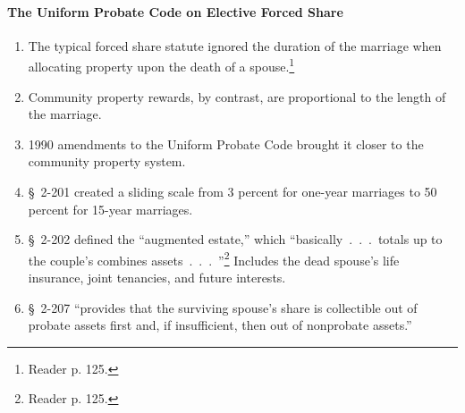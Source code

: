 
\paragraph{The Uniform Probate Code on Elective Forced Share}

\begin{enumerate}
    \item The typical forced share statute ignored the duration of the 
    marriage when allocating property upon the death of a 
    spouse.\footnote{Reader p. 125.}
    \item Community property rewards, by contrast, are proportional to the 
    length of the marriage.
    \item 1990 amendments to the Uniform Probate Code brought it closer to the 
    community property system.
    \item \S\ 2-201 created a sliding scale from 3 percent for one-year 
    marriages to 50 percent for 15-year marriages.
    \item \S\ 2-202 defined the ``augmented estate,'' which 
    ``basically~.~.~.~totals up to the couple's combines 
    assets~.~.~.~''\footnote{Reader p. 125.} Includes the dead spouse's life 
    insurance, joint tenancies, and future interests.
    \item \S\ 2-207 ``provides that the surviving spouse's share is 
    collectible out of probate assets first and, if insufficient, then out of 
    nonprobate assets.''
\end{enumerate}

%
%

